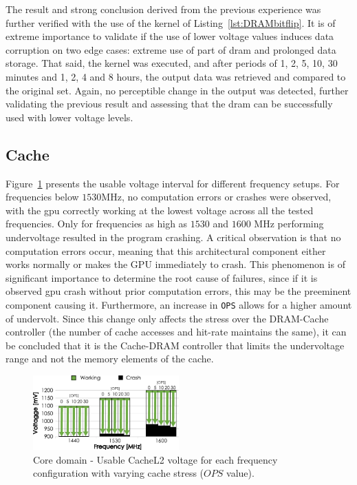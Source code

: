 The result and strong conclusion derived from the previous experience was further verified with the use of the kernel of Listing~\ref{lst:DRAMbitflip}. It is of extreme importance to validate if the use of lower voltage values induces data corruption on two edge cases: extreme use of part of \acrshort{dram} and prolonged data storage. That said, the kernel was executed, and after periods of 1, 2, 5, 10, 30 minutes and 1, 2, 4 and 8 hours, the output data was retrieved and compared to the original set. Again, no perceptible change in the output was detected, further validating the previous result and assessing that the \acrshort{dram} can be successfully used with lower voltage levels. 

\subsection{Cache}

Figure~\ref{fig:CacheL2_guardband} presents the usable voltage interval for different frequency setups. For frequencies below $1530$MHz, no computation errors or crashes were observed, with the \acrshort{gpu} correctly working at the lowest voltage across all the tested frequencies. Only for frequencies as high as $1530$ and $1600$ MHz performing undervoltage resulted in the program crashing. A critical observation is that no computation errors occur, meaning that this architectural component either works normally or makes the GPU immediately to crash. This phenomenon is of significant importance to determine the root cause of failures, since if it is observed \acrshort{gpu} crash without prior computation errors, this may be the preeminent component causing it.
Furthermore, an increase in \texttt{OPS} allows for a higher amount of undervolt. Since this change only affects the stress over the DRAM-Cache controller (the number of cache accesses and hit-rate maintains the same), it can be concluded that it is the Cache-DRAM controller that limits the undervoltage range and not the memory elements of the cache.


\begin{figure}[htb]
  \centering
  \includegraphics[width=0.5\textwidth]{Figures/GPU_characterization/CacheL2_guardband.pdf}
  \caption{Core domain - Usable CacheL2 voltage for each frequency configuration with varying cache stress ($OPS$ value).}
  \label{fig:CacheL2_guardband}
\end{figure}


